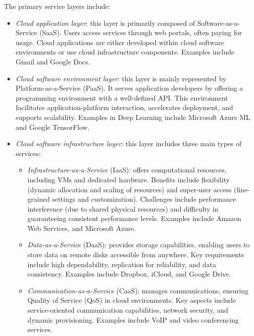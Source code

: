 The primary service layers include:
\begin{itemize}
    \item \textit{Cloud application layer}: this layer is primarily composed of Software-as-a-Service (SaaS). 
        Users access services through web portals, often paying for usage. 
        Cloud applications are either developed within cloud software environments or use cloud infrastructure components. 
        Examples include Gmail and Google Docs.
    \item \textit{Cloud software environment layer}: this layer is mainly represented by Platform-as-a-Service (PaaS). 
        It serves application developers by offering a programming environment with a well-defined API. 
        This environment facilitates application-platform interaction, accelerates deployment, and supports scalability. 
        Examples in Deep Learning include Microsoft Azure ML and Google TensorFlow.
    \item \textit{Cloud software infrastructure layer}: this layer includes three main types of services:
        \begin{itemize}
            \item \textit{Infrastructure-as-a-Service} (IaaS): offers computational resources, including VMs and dedicated hardware. 
                Benefits include flexibility (dynamic allocation and scaling of resources) and super-user access (fine-grained settings and customization). 
                Challenges include performance interference (due to shared physical resources) and difficulty in guaranteeing consistent performance levels.
                Examples include Amazon Web Services, and Microsoft Azure. 
            \item \textit{Data-as-a-Service} (DaaS): provides storage capabilities, enabling users to store data on remote disks accessible from anywhere. 
                Key requirements include high dependability, replication for reliability, and data consistency. 
                Examples include Dropbox, iCloud, and Google Drive.
            \item \textit{Communication-as-a-Service} (CaaS): manages communications, ensuring Quality of Service (QoS) in cloud environments. 
                Key aspects include service-oriented communication capabilities, network security, and dynamic provisioning. 
                Examples include VoIP and video conferencing services.
        \end{itemize}
\end{itemize}

